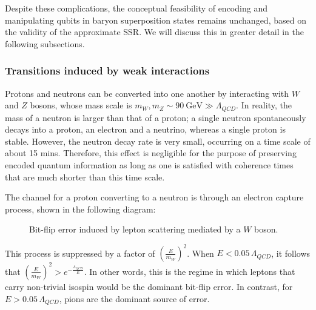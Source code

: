 \documentclass[11pt,english]{article}
\newcommand{\GeV}{\mathrm{GeV}}
\begin{document}
Despite these complications, the conceptual feasibility of encoding and manipulating qubits in baryon superposition states remains unchanged, based on the validity of the approximate SSR. We will discuss this in greater detail in the following subsections. 

\subsubsection*{Transitions induced by weak interactions}

Protons and neutrons can be converted into one another by interacting with $W$ and $Z$ bosons, whose mass scale is $m_W,m_Z\sim 90~\GeV \gg \Lambda_{QCD}$. In reality, the mass of a neutron is larger than that of a proton; a single neutron spontaneously decays into a proton, an electron and a neutrino, whereas a single proton is stable. However, the neutron decay rate is very small, occurring on a time scale of about 15 mins. Therefore, this effect is negligible for the purpose of preserving encoded quantum information as long as one is satisfied with coherence times that are much shorter than this time scale.

The channel for a proton converting to a neutron is through an electron capture process, shown in the following diagram:

\begin{figure}[H]
    \centering
    \caption{Bit-flip error induced by lepton scattering mediated by a $W$ boson.}
    \label{fig2}
\end{figure}

\noindent This process is suppressed by a factor of  $(\frac{E}{m_W})^2$. When $E< 0.05 \, \Lambda_{QCD}$, it follows that $(\frac{E}{m_W})^2>e^{-\frac{\Lambda_{QCD}}{E}}$. In other words, this is the regime in which leptons that carry non-trivial isospin would be the dominant bit-flip error. In contrast, for  $E>0.05 \, \Lambda_{QCD}$, pions are the dominant source of error. 
\end{document}
